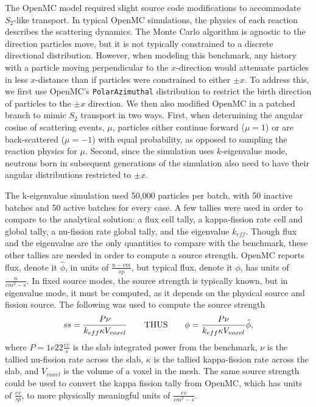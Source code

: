 \documentclass[letterpaper]{mc2023}
\begin{document}
The OpenMC model required slight source code modifications to accommodate $S_2$-like transport. In typical OpenMC simulations,
the physics of each reaction describes the scattering dynamics. The Monte Carlo algorithm is agnostic to the direction
particles move, but it is not typically constrained to a discrete directional distribution. However, when modeling this
benchmark, any history with a particle moving perpendicular to the $x$-direction would attenuate particles in less
$x$-distance than if particles were constrained to either $\pm x$. To address this, we first use OpenMC's \texttt{PolarAzimuthal}
distribution to restrict the birth direction of particles to the $\pm x$ direction. We then also modified OpenMC in a
patched branch to mimic $S_{2}$ transport in two ways. First, when determining the angular cosine of scattering events,
$\mu$, particles either continue forward ($\mu=1$) or are back-scattered ($\mu=-1$) with equal probability, as opposed to
sampling the reaction physics for $\mu$. Second, since the simulation uses $k$-eigenvalue mode, neutrons born in subsequent
generations of the simulation also need to have their angular distributions restricted to $\pm x$.

The k-eigenvalue simulation used 50,000 particles per batch, with 50 inactive batches and 50 active batches for every case. A few
tallies were used in order to compare to the analytical solution: a flux cell tally, a kappa-fission rate cell and global tally,
a nu-fission rate global tally, and the eigenvalue $k_{eff}$. Though flux and the eigenvalue are the only quantities to compare
with the benchmark, these other tallies are needed in order to compute a source strength. OpenMC reports flux, denote it $\hat{\phi}$,
in units of $\frac{n-cm}{sp}$, but typical flux, denote it $\phi$, has units of $\frac{n}{cm^2-s}$. In fixed source modes, the source
strength is typically known, but in eigenvalue mode, it must be computed, as it depends on the physical source and fission source.
The following was used to compute the source strength
\begin{equation} \label{eq:source_strength}
   ss = \frac{P\nu}{k_{eff} \kappa V_{voxel}} \qquad \text{THUS} \qquad \phi = \frac{P\nu}{k_{eff} \kappa V_{voxel} }\hat{\phi},
\end{equation}
where $P=1e22 \frac{ev}{s}$ is the slab integrated power from the benchmark, $\nu$ is the tallied nu-fission rate across the slab,
$\kappa$ is the tallied kappa-fission rate across the slab, and $V_{voxel}$ is the volume of a voxel in the mesh. The same source
strength could be used to convert the kappa fission tally from OpenMC, which has units of $\frac{ev}{sp}$, to more physically
meaningful units of $\frac{ev}{cm^3-s}$.
\end{document}
